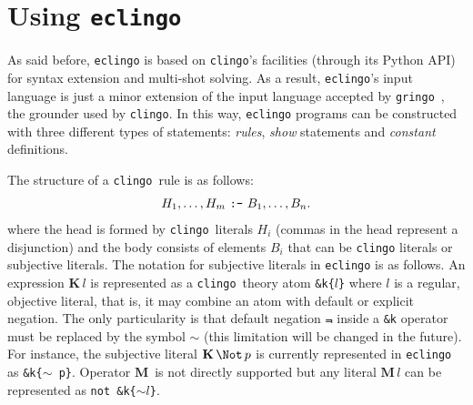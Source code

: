 \documentclass{new_tlp}
\def\K{\mathbf{K}\, }
\def\M{\mathbf{M}\, }
\let\sneg\relax
\newcommand{\sneg}{\ensuremath{\text{-}}}
\def\eclingo{{\tt eclingo}}
\def\clingo{{\tt clingo}}
\def\gringo{{\tt gringo}}
\begin{document}
\section{Using \texttt{eclingo}}
\label{sec:input}

As said before, \eclingo{} is based on \clingo's facilities (through its Python API) for syntax extension and multi-shot solving.
%
As a result, \eclingo's input language is just a minor extension of the input language accepted by \gringo~\cite{gekaosscth09a},
the grounder used by \clingo.
In this way, \eclingo{} programs can be constructed with three different types of statements: \emph{rules}, \emph{show} statements and \emph{constant} definitions.

The structure of a \clingo\ rule is as follows:
\begin{align*}
    H_1,\dots,H_m  \text{ \texttt{:-} }  B_1,\dots,B_n.
\end{align*}
where the head is formed by \clingo\ literals $H_i$ (commas in the head represent a disjunction) and
the body consists of elements $B_i$ that can be \clingo{} literals or subjective literals.
%
The notation for subjective literals in \eclingo{} is as follows.
%
An expression $\K l$ is represented as a \clingo\ theory atom {\tt \&k\{$l$\}} where $l$ is a regular, objective literal, that is, it may combine an atom with default or explicit negation.
%
The only particularity is that default negation $\Not$ inside a {\tt \&k} operator must be replaced by the symbol $\sim$ (this limitation will be changed in the future).
%
For instance, the subjective literal $\K \Not\, \sneg p$ is currently represented in \eclingo{} as \mbox{\tt \&k\{$\sim$\,\sneg p\}}.
%
Operator $\M$ is not directly supported but any literal $\M l$ can be represented as {\tt not \&k\{$\sim l$\}}.
\end{document}
